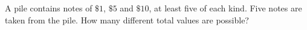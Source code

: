 A pile contains notes of $\$1$, $\$5$ and $\$10$, at least five of each kind. Five notes are taken from the pile. How many different total values are possible?
